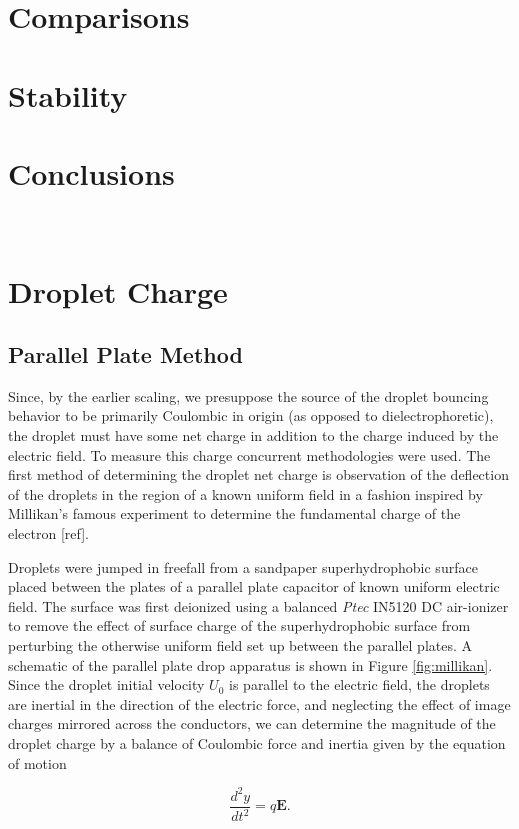 \documentclass[a4paper, 12pt]{article}
\begin{document}
\section{Comparisons}
\section{Stability}
\section{Conclusions}
\appendix

\section{\\Droplet Charge} \label{sec.drop_charge}
\subsection*{Parallel Plate Method}
Since, by the earlier scaling, we presuppose the source of the droplet bouncing behavior to be primarily Coulombic in origin (as opposed to dielectrophoretic), the droplet must have some net charge in addition to the charge induced by the electric field. To measure this charge concurrent methodologies were used. The first method of determining the droplet net charge is observation of the deflection of the droplets in the region of a known uniform field in a fashion inspired by Millikan's famous experiment to determine the fundamental charge of the electron [ref].

Droplets were jumped in freefall from a sandpaper superhydrophobic surface placed between the plates of a parallel plate capacitor of known uniform electric field. The surface was first deionized using a balanced \emph{Ptec} IN5120 DC air-ionizer to remove the effect of surface charge of the superhydrophobic surface from perturbing the otherwise uniform field set up between the parallel plates. A schematic of the parallel plate drop apparatus is shown in Figure \ref{fig:millikan}. Since the droplet initial velocity $U_0$ is parallel to the electric field, the droplets are inertial in the direction of the electric force, and neglecting the effect of image charges mirrored across the conductors, we can determine the magnitude of the droplet charge by a balance of Coulombic force and inertia given by the equation of motion

\[ \frac{d^2y}{dt^2} = q\mathbf{E}. \]
\end{document}
